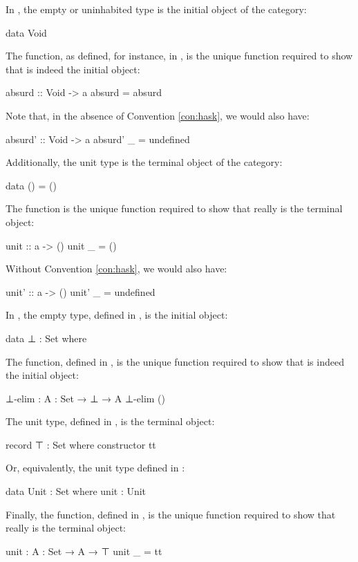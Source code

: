 \begin{example}
  \label{ex:initial-terminal-objects-haskell}

  In \hask, the empty or uninhabited type is the initial object of the
  category:
  \begin{codehaskell}
data Void
  \end{codehaskell}
  The  function, as defined, for instance, in
  \parencite{kmett-2012}, is the unique function required to show that
   is indeed the initial object:
  \begin{codehaskell}
absurd :: Void -> a
absurd = absurd
  \end{codehaskell}
  Note that, in the absence of Convention \ref{con:hask}, we would
  also have:
  \begin{codehaskell}
absurd' :: Void -> a
absurd' _ = undefined
  \end{codehaskell}
  Additionally, the unit type is the terminal object of the category:
  \begin{codehaskell}
data () = ()
  \end{codehaskell}
  The  function is the unique function required to
  show that \texthaskell{()} really is the terminal object:
  \begin{codehaskell}
unit :: a -> ()
unit _ = ()
  \end{codehaskell}
  Without Convention \ref{con:hask}, we would also have:
  \begin{codehaskell}
unit' :: a -> ()
unit' _ = undefined
  \end{codehaskell}

\end{example}

\begin{example}
  \label{ex:initial-terminal-objects-agda}

  In \agda, the empty type, defined in , is the
  initial object:
  \begin{codeagda}
data ⊥ : Set where
  \end{codeagda}
  The  function, defined in ,
  is the unique function required to show that  is indeed
  the initial object:
  \begin{codeagda}
⊥-elim : {A : Set} → ⊥ → A
⊥-elim ()
  \end{codeagda}
  The unit type, defined in , is the terminal
  object:
  \begin{codeagda}
record ⊤ : Set where
  constructor tt
  \end{codeagda}
  Or, equivalently, the unit type defined in :
  \begin{codeagda}
data Unit : Set where
  unit : Unit
  \end{codeagda}
  Finally, the  function, defined in
  , is the unique function required to show
  that  really is the terminal object:
  \begin{codeagda}
unit : {A : Set} → A → ⊤
unit _ = tt
  \end{codeagda}

\end{example}

